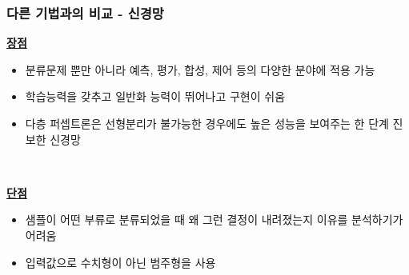 \documentclass{beamer}
\begin{document}
\begin{frame}
\frametitle{다른 기법과의 비교 - \textcolor[rgb]{1.00,0.50,0.25}{신경망}}
{\scriptsize{}

	\underline{\textbf{장점}}

	\begin{itemize}

		\item 분류문제 뿐만 아니라 예측, 평가, 합성, 제어 등의 다양한 분야에 적용 가능
		
		\item 학습능력을 갖추고 일반화 능력이 뛰어나고 구현이 쉬움
		
		\item 다층 퍼셉트론은 선형분리가 불가능한 경우에도 높은 성능을 보여주는 한 단계 진보한 신경망
		
	\end{itemize}

	{}\


	\underline{\textbf{단점}}

	\begin{itemize}

		\item 샘플이 어떤 부류로 분류되었을 때 왜 그런 결정이 내려졌는지 이유를 분석하기가 어려움

		\item 입력값으로 수치형이 아닌 범주형을 사용
		
	\end{itemize}
}
\end{frame}
\end{document}
